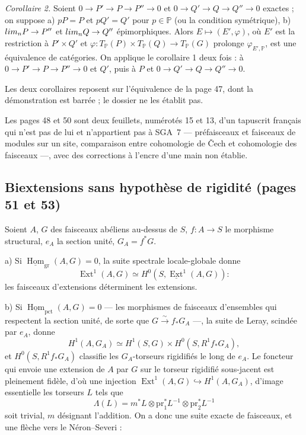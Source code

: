 \documentclass[11pt,a4paper]{article}
\begin{document}
\emph{Corollaire 2.} Soient $0 \to P' \to P \to P'' \to 0$ et $0 \to Q' \to Q
\to Q'' \to 0$ exactes ; on suppose a) $pP = P$ et $pQ' = Q'$ pour $p \in
\mathbb{P}$ (ou la condition symétrique), b) $\varinjlim {}_nP \to P''$ et
$\varinjlim {}_nQ \to Q''$ épimorphiques. Alors $E \mapsto (E', \varphi)$, où
$E'$ est la restriction à $P' \times Q'$ et $\varphi\colon T_{\mathbb{P}}(P)
\times T_{\mathbb{P}}(Q) \to T_{\mathbb{P}}(G)$ prolonge $\varphi_{E',
\mathbb{P}}$, est une équivalence de catégories. On applique le corollaire 1 deux
fois : à $0 \to P' \to P \to P'' \to 0$ et $Q'$, puis à $P$ et $0 \to Q' \to Q \to
Q'' \to 0$.

Les deux corollaires reposent sur l'équivalence de la page 47, dont la
démonstration est barrée ; le dossier ne les établit pas.

Les pages 48 et 50 sont deux feuillets, numérotés 15 et 13, d'un tapuscrit
français qui n'est pas de lui et n'appartient pas à SGA~7 --- préfaisceaux et
faisceaux de modules sur un site, comparaison entre cohomologie de Čech et
cohomologie des faisceaux ---, avec des corrections à l'encre d'une main non
établie.

\subsection*{Biextensions sans hypothèse de rigidité (pages 51 et 53)}

Soient $A$, $G$ des faisceaux abéliens au-dessus de $S$, $f\colon A \to S$
le morphisme structural, $e_A$ la section unité, $G_A = f^*G$.

a) Si $\underline{\operatorname{Hom}}_{\mathrm{gr}}(A, G) = 0$, la suite
spectrale locale-globale donne
\[ \operatorname{Ext}^1(A, G) \simeq H^0(S,
\underline{\operatorname{Ext}}^1(A, G)) : \]
les faisceaux d'extensions déterminent les extensions.

b) Si $\underline{\operatorname{Hom}}_{\mathrm{pct}}(A, G) = 0$ --- les morphismes
de faisceaux d'ensembles qui respectent la section unité, de sorte que $G
\xrightarrow{\sim} f_*G_A$ ---, la suite de Leray, scindée par $e_A$, donne
\[ H^1(A, G_A) \simeq H^1(S, G) \times H^0(S, R^1f_*G_A) , \]
et $H^0(S, R^1f_*G_A)$ classifie les $G_A$-torseurs rigidifiés le long de
$e_A$. Le foncteur qui envoie une extension de $A$ par $G$ sur le torseur
rigidifié sous-jacent est pleinement fidèle, d'où une injection
$\operatorname{Ext}^1(A, G) \hookrightarrow H^1(A, G_A)$, d'image essentielle
les torseurs $L$ tels que
\[ \Lambda(L) = m^*L \otimes \mathrm{pr}_1^*L^{-1} \otimes \mathrm{pr}_2^*L^{-1}
\]
soit trivial, $m$ désignant l'addition. On a donc une suite exacte de faisceaux,
et une flèche vers le Néron--Severi :
\end{document}
